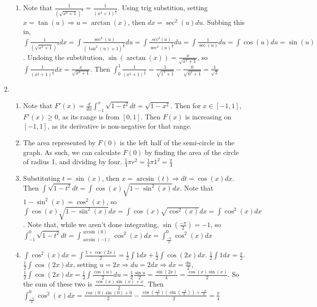 \documentclass[10pt,english]{article}
\begin{document}
\begin{enumerate}
\begin{enumerate}
    \item Note that $\frac{1}{(\sqrt{x^2+1})^3}=\frac{1}{(x^2+1)^{\frac{3}{2}}}$. Using trig substition, setting $x=\tan(u)\Rightarrow u=\arctan(x)$, then $dx=\sec^2(u)du$. Subbing this in, $\int\frac{1}{(\sqrt{x^2+1})^3}dx=\int\frac{\sec^2(u)}{(\tan^2(u)+1)^{\frac{3}{2}}}du=\int\frac{sec^2(u)}{\sec^2(u)^{\frac{3}{2}}}du=\int\frac{1}{\sec(u)}du=\int\cos(u)du=\sin(u)$. Undoing the substitution, $\sin(\arctan(x))=\frac{x}{\sqrt{x^2+1}}$, so $\int\frac{1}{(x^2+1)^{\frac{3}{2}}}dx=\frac{x}{\sqrt{x^2+1}}$. Then $\int_0^1\frac{1}{(x^2+1)^\frac{3}{2}}=\frac{1}{\sqrt{1^2+1}}-\frac{0}{\sqrt{0^2+1}}=\frac{1}{\sqrt{2}}$
\end{enumerate}

\item \begin{enumerate}
    \item Note that $F'(x)=\frac{d}{dx}\int_{-1}^x\sqrt{1-t^2}dt=\sqrt{1-x^2}$. Then for $x\in[-1,1]$, $F'(x)\geq0$, as its range is from $[0,1]$. Then $F(x)$ is increasing on $[-1,1]$, as its derivative is non-negative for that range.
    \item The area represented by $F(0)$ is the left half of the semi-circle in the graph. As such, we can calculate $F(0)$ by finding the area of the circle of radius 1, and dividing by four. $\frac{1}{4}\pi r^2=\frac{1}{4}\pi 1^2=\frac{\pi}{4}$
    \item Substituting $t=\sin(x)$, then $x=\arcsin(t)\Rightarrow dt=\cos(x)dx$. Then $\int\sqrt{1-t^2}dt=\int\cos(x)\sqrt{1-\sin^2(x)}dx$. Note that $1-\sin^2(x)=\cos^2(x)$, so $\int\cos(x)\sqrt{1-\sin^2(x)}dx=\int\cos(x)\sqrt{\cos^2(x)}dx=\int\cos^2(x)dx$. Note that, while we aren't done integrating, $\sin\left(\frac{-\pi}{2}\right)=-1$, so $\int_{-1}^0\sqrt{1-t^2}dt=\int_{\arcsin(-1)}^{\arcsin(0)}\cos^2(x)dx=\int_{\frac{-\pi}{2}}^{0}\cos^2(x)dx$
    \item $\int\cos^2(x)dx=\int\frac{1+\cos(2x)}{2}=\frac{1}{2}\int1dx+\frac{1}{2}\int\cos(2x)dx$. $\frac{1}{2}\int1dx=\frac{x}{2}$. $\frac{1}{2}\int\cos(2x)dx$, setting $u=2x\Rightarrow du=2dx\Rightarrow dx=\frac{du}{2}$, $\frac{1}{2}\int\cos(2x)dx=\frac{1}{2}\int\frac{\cos(u)}{2}du=\frac{1}{2}\frac{\sin{u}}{2}=\frac{\sin(2x)}{4}=\frac{\cos(x)\sin(x)}{2}$. So the sum of these two is $\frac{\cos(x)\sin(x)+x}{2}$. Then $\int_{\frac{-\pi}{2}}^0\cos^2(x)dx=\frac{\cos(0)\sin(0)+0}{2}-\frac{\cos\left(\frac{-\pi}{2}\right)\left(\sin(\frac{-\pi}{2})\right)+\frac{-\pi}{2}}{2}=\frac{\pi}{4}$
\end{enumerate}


\end{enumerate}
\end{document}
